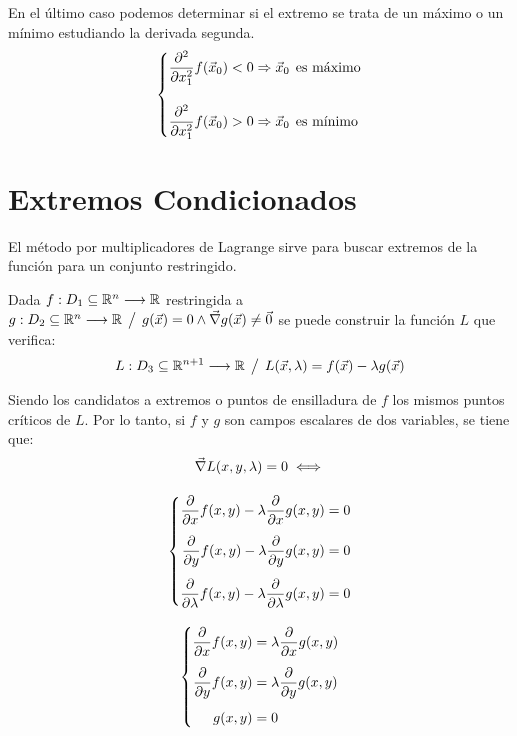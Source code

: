 En el último caso podemos determinar si el extremo se trata de un máximo o un mínimo estudiando la derivada segunda.
\begin{equation*}
    \left\{
    \begin{aligned}
        \frac{\partial^2}{\partial x_1^2} f(\Vec{x}_0) < 0 &\Rightarrow \Vec{x}_0 \hspace{1ex} \textrm{es máximo}
        \\[1em]
        \frac{\partial^2}{\partial x_1^2} f(\Vec{x}_0) > 0 &\Rightarrow \Vec{x}_0 \hspace{1ex} \textrm{es mínimo}
    \end{aligned}
    \right.
\end{equation*}


\section{Extremos Condicionados}

El método por multiplicadores de Lagrange sirve para buscar extremos de la función para un conjunto restringido.

Dada $f:D_1 \subseteq \mathbb{R}^n \longrightarrow \mathbb{R}$ restringida a $g:D_2 \subseteq \mathbb{R}^n \longrightarrow \mathbb{R} \hspace{1ex} \big/ \hspace{1ex} g(\Vec{x})=0 \land \Vec{\nabla} g(\Vec{x}) \neq \Vec{0}$ se puede construir la función $L$ que verifica:
\begin{equation*}
    L:D_3 \subseteq \mathbb{R}^{n+1} \longrightarrow \mathbb{R} \hspace{1ex} \big/ \hspace{1ex} L(\Vec{x}, \lambda) = f(\Vec{x}) - \lambda g(\Vec{x})
\end{equation*}

Siendo los candidatos a extremos o puntos de ensilladura de $f$ los mismos puntos críticos de $L$.
Por lo tanto, si $f$ y $g$ son campos escalares de dos variables, se tiene que:
\begin{gather*}
    \Vec{\nabla} L(x,y,\lambda)=0 \iff
    \\[1em]
    \left\{
    \begin{aligned}
        \frac{\partial}{\partial x} f(x,y) - \lambda \frac{\partial}{\partial x} g(x,y) &= 0
        \\[1ex]
        \frac{\partial}{\partial y} f(x,y) - \lambda \frac{\partial}{\partial y} g(x,y) &= 0
        \\[1ex]
        \frac{\partial}{\partial \lambda} f(x,y) - \lambda \frac{\partial}{\partial \lambda} g(x,y) &= 0
    \end{aligned}
    \right.
    \\[1em]
    \left\{
    \begin{aligned}
        \frac{\partial}{\partial x} f(x,y) &= \lambda \frac{\partial}{\partial x} g(x,y)
        \\[1ex]
        \frac{\partial}{\partial y} f(x,y) &= \lambda \frac{\partial}{\partial y} g(x,y)
        \\[1ex]
        g(x,y) &= 0
    \end{aligned}
    \right.
\end{gather*}